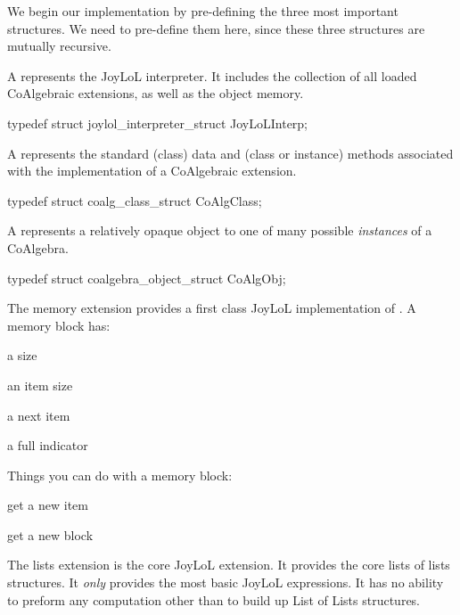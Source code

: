 We begin our implementation by pre-defining the three most important 
structures. We need to pre-define them here, since these three structures 
are mutually recursive. 

\startitemize

\item A  represents the JoyLoL interpreter. It includes 
the collection of all loaded CoAlgebraic extensions, as well as the object 
memory. 

\startCHeader 
typedef struct joylol_interpreter_struct JoyLoLInterp;
\stopCHeader 

\item A  represents the standard (class) data and (class 
or instance) methods associated with the implementation of a CoAlgebraic 
extension. 

\startCHeader
typedef struct coalg_class_struct CoAlgClass;
\stopCHeader

\item A  represents a relatively opaque object to one of 
many possible \emph{instances} of a CoAlgebra. 

\startCHeader
typedef struct coalgebra_object_struct CoAlgObj;
\stopCHeader 
\stopitemize

The memory extension provides a first class JoyLoL implementation of 
. A memory block has:

\startitemize

\item a size

\item an item size

\item a next item

\item a full indicator

\stopitemize

Things you can do with a memory block:

\startitemize

\item get a new item

\item get a new block

\stopitemize


The lists extension is the core JoyLoL extension. It provides the core 
lists of lists structures. It \emph{only} provides the most basic JoyLoL 
expressions. It has no ability to preform any computation other than to 
build up List of Lists structures. 

